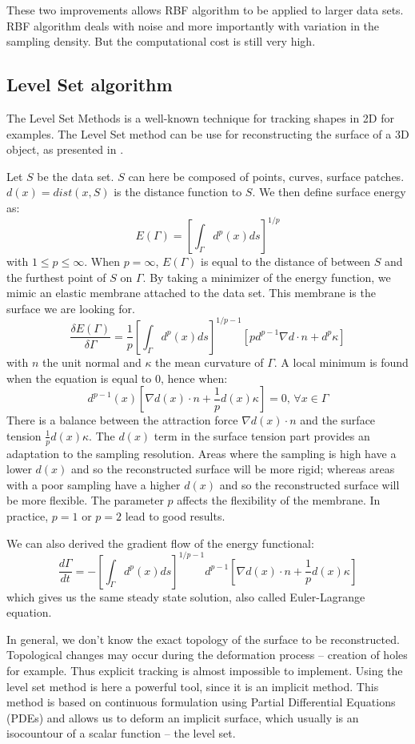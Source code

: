 \documentclass[12pt]{article}
\begin{document}
These two improvements allows RBF algorithm to be applied to larger data sets. RBF algorithm deals with noise and more importantly with variation in the sampling density. But the computational cost is still very high. 

\subsection{Level Set algorithm}
The Level Set Methods is a well-known technique for tracking shapes in 2D for examples. The Level Set method can be use for reconstructing the surface of a 3D object, as presented in \cite{LSM1,LSM2}.

Let $S$ be the data set. $S$ can here be composed of points, curves, surface patches. $d(x) = dist(x,S)$ is the distance function to $S$. We then define surface energy as:
$$E(\Gamma) = \left[\int_{\Gamma} d^p(x)ds\right]^{1/p}$$
with $1 \le p \le \infty$. When $p = \infty$, $E(\Gamma)$ is equal to the distance of between $S$ and the furthest point of $S$ on $\Gamma$. By taking a minimizer of the energy function, we mimic an elastic membrane attached to the data set. This membrane is the surface we are looking for.
$$\frac{\delta E(\Gamma)}{\delta\Gamma} = \frac{1}{p}\left[\int_{\Gamma} d^p(x)ds\right]^{1/p - 1}[pd^{p-1}\nabla d \cdot n +d^p\kappa]$$
with $n$ the unit normal and $\kappa$ the mean curvature of $\Gamma$. A local minimum is found when the equation is equal to 0, hence when:
$$d^{p-1}(x)[\nabla d(x) \cdot n + \frac{1}{p}d(x)\kappa] = 0\text{, }\forall x\in\Gamma$$
There is a balance between the attraction force $\nabla d(x) \cdot n$ and the surface tension $\frac{1}{p}d(x)\kappa$. The $d(x)$ term in the surface tension part provides an adaptation to the sampling resolution. Areas where the sampling is high have a lower $d(x)$ and so the reconstructed surface will be more rigid; whereas areas with a poor sampling have a higher $d(x)$ and so the reconstructed surface will be more flexible. The parameter $p$ affects the flexibility of the membrane. In practice, $p = 1$ or $p = 2$ lead to good results.

We can also derived the gradient flow of the energy functional:
$$\frac{d\Gamma}{dt} = -\left[\int_{\Gamma} d^p(x)ds\right]^{1/p - 1}d^{p-1}[\nabla d(x) \cdot n +\frac{1}{p}d(x)\kappa]$$
which gives us the same steady state solution, also called Euler-Lagrange equation.

In general, we don't know the exact topology of the surface to be reconstructed. Topological changes may occur during the deformation process -- creation of holes for example. Thus explicit tracking is almost impossible to implement. Using the level set method is here a powerful tool, since it is an implicit method. This method is based on continuous formulation using Partial Differential Equations (PDEs) and allows us to deform an implicit surface, which usually is an isocountour of a scalar function -- the level set.
\end{document}
